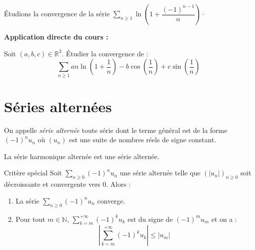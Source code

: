 \documentclass[french,11pt,twoside]{VcCours}
\newenvironment{ApplicationDirecte}{\textbf{Application directe du cours :}

}{}
\newcommand{\Sum}[2]{\ensuremath{\textstyle{\sum\limits_{#1}^{#2}}}}
\begin{document}
\begin{Exemple} Étudions la convergence de la série $\Sum{n\geq 1}{} \ln \left( 1 + \dfrac{(-1)^{n-1}}{n} \right) \cdot$
%

\vspace{6cm}
\end{Exemple}

\begin{ApplicationDirecte} Soit $(a,b,c) \in \mathbb{R}^3$. Étudier la convergence de :
$$ \Sum{n \geq 1}{} a n \ln \left(1 + \frac{1}{n} \right) - b \cos \left( \frac{1}{n} \right) + c \sin \left( \frac{1}{n} \right)$$
\end{ApplicationDirecte}

\section{Séries alternées}

\begin{Definition}{} On appelle \emph{série alternée} toute série dont le terme général est de la forme $(-1)^n u_n$ où $(u_n)$ est une suite de nombres réels de signe constant.
\end{Definition}

\begin{Exemple} La série harmonique alternée est une série alternée.
\end{Exemple}

\begin{Theoreme}{Critère spécial}
Soit $\Sum{n \geq 0}{} (-1)^n u_n$ une série alternée telle que $(\vert u_n \vert)_{n \geq 0}$ soit décroissante et convergente vers $0$. Alors :
\begin{enumerate}
\item La série $\Sum{n \geq 0}{} (-1)^n u_n$ converge.
\item Pour tout $m \in \mathbb{N}$, $\Sum{k=m}{+ \infty} (-1)^k u_k$ est du signe de $(-1)^m u_m$ et on a :
$$ \left\vert \sum_{k=m}^{+ \infty} (-1)^k u_k \right\vert \leq \vert u_m \vert$$
\end{enumerate}
\end{Theoreme}
\end{document}

